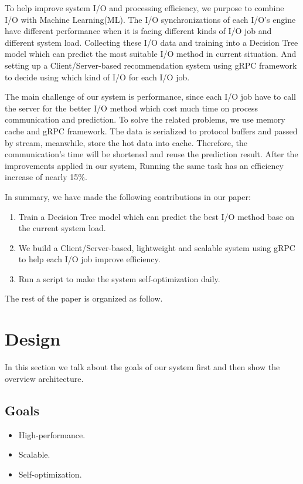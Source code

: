 \documentclass[conference]{IEEEtran}
\begin{document}
To help improve system I/O and processing efficiency, we purpose to combine I/O with Machine Learning(ML). The I/O synchronizations of each I/O's engine 
have different performance when it is facing different kinds of I/O job and different system load. Collecting these I/O data and training into a Decision Tree model 
which can predict the most suitable I/O method in current situation. And setting up a Client/Server-based recommendation system using gRPC framework to decide using which kind of I/O for each I/O job.


The main challenge of our system is performance, since each I/O job have to call the server for the better I/O method which cost much time on process communication and prediction.
To solve the related problems, we use memory cache and gRPC framework. The data is serialized to protocol buffers and passed by stream, meanwhile, store the hot data into cache.
Therefore, the communication's time will be shortened and reuse the prediction result. After the improvements applied in our system, Running the same task has an efficiency increase of nearly 15\%.

In summary, we have made the following contributions in our paper:
\begin{enumerate}
    \item Train a Decision Tree model which can predict the best I/O method base on the current system load.
    \item We build a Client/Server-based, lightweight and scalable system using gRPC to help each I/O job improve efficiency.
    \item Run a script to make the system self-optimization daily.
\end{enumerate}

The rest of the paper is organized as follow.





\section{Design}
In this section we talk about the goals of our system first and then show the overview architecture.
\subsection{Goals}
\begin{itemize}
    \item High-performance.
    \item Scalable.
    \item Self-optimization.
\end{itemize}
\end{document}
